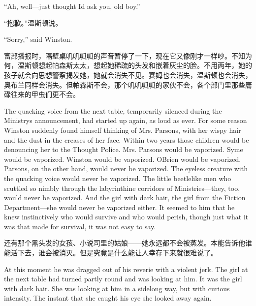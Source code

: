 \begin{paracol}{2}
\switchcolumn*

``Ah, well---just thought I\textquotesingle d ask you, old boy.''

\switchcolumn

``抱歉。''温斯顿说。

\switchcolumn*

``Sorry,'' said Winston.

\switchcolumn

富部播报时，隔壁桌叽叽呱呱的声音暂停了一下，现在它又像刚才一样吵。不知为何，温斯顿想起帕森斯太太，想起她稀疏的头发和嵌着灰尘的脸。不用两年，她的孩子就会向思想警察揭发她，她就会消失不见。赛姆也会消失，温斯顿也会消失，奥布兰同样会消失。但帕森斯不会，那个叽叽呱呱的家伙不会，各个部门里那些庸碌往来的甲虫们更不会。

\switchcolumn*

The quacking voice from the next table, temporarily silenced during the
Ministry\textquotesingle s announcement, had started up again, as loud
as ever. For some reason Winston suddenly found himself thinking of Mrs.
Parsons, with her wispy hair and the dust in the creases of her face.
Within two years those children would be denouncing her to the Thought
Police. Mrs. Parsons would be vaporized. Syme would be vaporized.
Winston would be vaporized. O\textquotesingle Brien would be vaporized.
Parsons, on the other hand, would never be vaporized. The eyeless
creature with the quacking voice would never be vaporized. The little
beetlelike men who scuttled so nimbly through the labyrinthine corridors
of Ministries---they, too, would never be vaporized. And the girl with
dark hair, the girl from the Fiction Department---she would never be
vaporized either. It seemed to him that he knew instinctively who would
survive and who would perish, though just what it was that made for
survival, it was not easy to say.

\switchcolumn

还有那个黑头发的女孩、小说司里的姑娘——她永远都不会被蒸发。本能告诉他谁能活下去，谁会被消灭。但是究竟是什么能让人幸存下来就很难说了。

\switchcolumn*

At this moment he was dragged out of his reverie with a violent jerk.
The girl at the next table had turned partly round and was looking at
him. It was the girl with dark hair. She was looking at him in a
sidelong way, but with curious intensity. The instant that she caught
his eye she looked away again.

\switchcolumn


\end{paracol}
